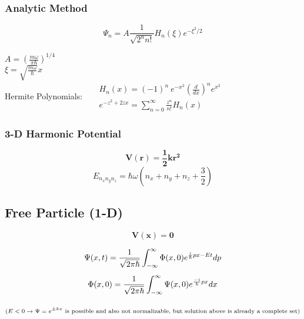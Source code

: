 \documentclass[12pt]{article}
\begin{document}
\vspace{1cm}

\subsubsection{Analytic Method}

\boldmath \[ \Psi_n = A \frac{1}{\sqrt{2^n n!}} H_n(\xi) e^{- \xi^2 / 2} \] \unboldmath

\vspace{5pt}\noindent
\( A = \left( \frac{m \omega }{\pi \hbar} \right)^{1/4} \) \\[10pt]
\( \xi = \sqrt{ \frac{m \omega }{\hbar} } x\) \\[10pt]
Hermite Polynomials: \ \( \begin{aligned}
    &H_n(x) = (-1)^n \ e^{-x^2} \left( \frac{d}{dx} \right)^n e^{x^2}\\[5pt]
    &e^{-z^2 + 2zx} = \sum_{n=0}^\infty \frac{z^n}{n!} H_n(x)
\end{aligned} \)

\vspace{10pt}\noindent
\subsubsection{3-D Harmonic Potential}

\[ \boldsymbol{V(r) = \frac{1}{2} k r^2} \]
\[ \boxed{ E_{n_x n_y n_z} = \hbar \omega \left(n_x + n_y + n_z + \frac{3}{2}\right) } \]

\newpage
\subsection{Free Particle (1-D)}
\[ \boldsymbol{ V(x) = 0 }\]

\vspace{10pt}
\[ \begin{gathered}
    \Psi(x,t) = \frac{1}{\sqrt{2\pi\hbar}} \int_{-\infty}^\infty \Phi(x,0) e^{\frac{i}{\hbar} p x - E t} dp\\[5pt]
    \Phi(x,0) = \frac{1}{\sqrt{2\pi\hbar}} \int_{-\infty}^\infty \Psi(x,0) e^{\frac{-i}{\hbar} p x} dx\\[10pt]
    \text{\scriptsize(\(E<0 \rightarrow \Psi = e^{\pm kx}\) is possible and also not normalizable, 
    but solution above is already a complete set)}
\end{gathered} \]
\end{document}
